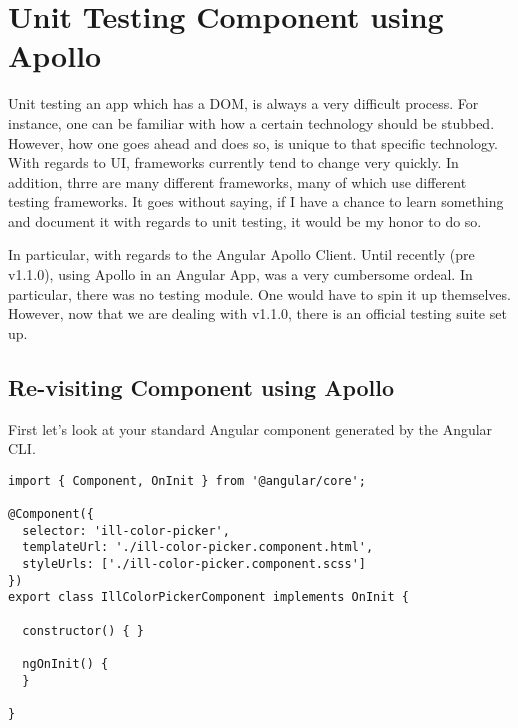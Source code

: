 \maketitle{}
\section{ Unit Testing Component using Apollo }

Unit testing an app which has a DOM, is always a very difficult process. For
instance, one can be familiar with how a certain technology should be stubbed.
However, how one goes ahead and does so, is unique to that specific technology.
With regards to UI, frameworks currently tend to change very quickly. In
addition, thrre are many different frameworks, many of which use different
testing frameworks. It goes without saying, if I have a chance to learn
something and document it with regards to unit testing, it would be my honor to
do so.

In particular, with regards to the Angular Apollo Client. Until recently
(pre v1.1.0), using Apollo in an Angular App, was a very cumbersome ordeal.
In particular, there was no testing module. One would have to spin it up
themselves. However, now that we are dealing with v1.1.0, there is an official
testing suite set up.

\subsection { Re-visiting Component using Apollo }
First let's look at your standard Angular component generated by the Angular
CLI. 

\begin{lstlisting}
import { Component, OnInit } from '@angular/core';

@Component({
  selector: 'ill-color-picker',
  templateUrl: './ill-color-picker.component.html',
  styleUrls: ['./ill-color-picker.component.scss']
})
export class IllColorPickerComponent implements OnInit {

  constructor() { }

  ngOnInit() {
  }

}
\end{lstlisting}
